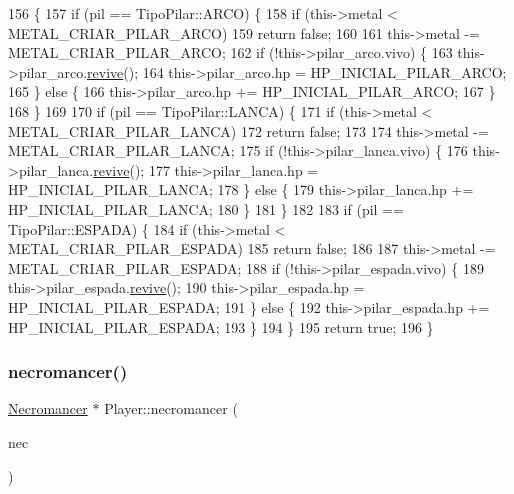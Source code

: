 \begin{DoxyCode}
156                                       \{
157     \textcolor{keywordflow}{if} (pil == TipoPilar::ARCO) \{
158         \textcolor{keywordflow}{if} (this->metal < METAL\_CRIAR\_PILAR\_ARCO)
159             \textcolor{keywordflow}{return} \textcolor{keyword}{false};
160 
161         this->metal -= METAL\_CRIAR\_PILAR\_ARCO;
162         \textcolor{keywordflow}{if} (!this->pilar\_arco.vivo) \{
163             this->pilar\_arco.\mbox{\hyperlink{class_colocavel_em_bloco_a82f12304bcb919f4fe3fc765d00a3d0f}{revive}}();
164             this->pilar\_arco.hp = HP\_INICIAL\_PILAR\_ARCO;
165         \} \textcolor{keywordflow}{else} \{
166             this->pilar\_arco.hp += HP\_INICIAL\_PILAR\_ARCO;
167         \}
168     \}
169 
170     \textcolor{keywordflow}{if} (pil == TipoPilar::LANCA) \{
171         \textcolor{keywordflow}{if} (this->metal < METAL\_CRIAR\_PILAR\_LANCA)
172             \textcolor{keywordflow}{return} \textcolor{keyword}{false};
173 
174         this->metal -= METAL\_CRIAR\_PILAR\_LANCA;
175         \textcolor{keywordflow}{if} (!this->pilar\_lanca.vivo) \{
176             this->pilar\_lanca.\mbox{\hyperlink{class_colocavel_em_bloco_a82f12304bcb919f4fe3fc765d00a3d0f}{revive}}();
177             this->pilar\_lanca.hp = HP\_INICIAL\_PILAR\_LANCA;
178         \} \textcolor{keywordflow}{else} \{
179             this->pilar\_lanca.hp += HP\_INICIAL\_PILAR\_LANCA;
180         \}
181     \}
182 
183     \textcolor{keywordflow}{if} (pil == TipoPilar::ESPADA) \{
184         \textcolor{keywordflow}{if} (this->metal < METAL\_CRIAR\_PILAR\_ESPADA)
185             \textcolor{keywordflow}{return} \textcolor{keyword}{false};
186 
187         this->metal -= METAL\_CRIAR\_PILAR\_ESPADA;
188         \textcolor{keywordflow}{if} (!this->pilar\_espada.vivo) \{
189             this->pilar\_espada.\mbox{\hyperlink{class_colocavel_em_bloco_a82f12304bcb919f4fe3fc765d00a3d0f}{revive}}();
190             this->pilar\_espada.hp = HP\_INICIAL\_PILAR\_ESPADA;
191         \} \textcolor{keywordflow}{else} \{
192             this->pilar\_espada.hp += HP\_INICIAL\_PILAR\_ESPADA;
193         \}
194     \}
195     \textcolor{keywordflow}{return} \textcolor{keyword}{true};
196 \}
\end{DoxyCode}
\mbox{\label{class_player_a560ffc698994e73527433dd2bf4d2c0d}} 
\subsubsection{\texorpdfstring{necromancer()}{necromancer()}}
{\footnotesize\ttfamily \mbox{\hyperlink{class_necromancer}{Necromancer}} $\ast$ Player\+::necromancer (\begin{DoxyParamCaption}\item[{Tipo\+Necromancer}]{nec }\end{DoxyParamCaption})}


